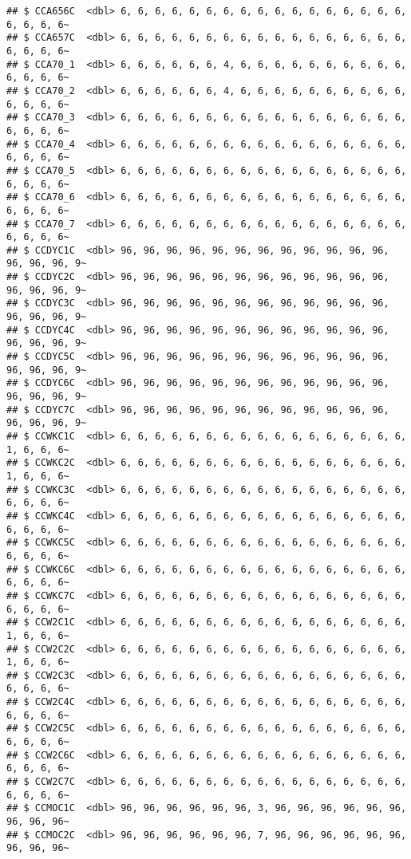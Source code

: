 \documentclass[
]{article}
\begin{document}
\begin{verbatim}
## $ CCA656C  <dbl> 6, 6, 6, 6, 6, 6, 6, 6, 6, 6, 6, 6, 6, 6, 6, 6, 6, 6, 6, 6, 6~
## $ CCA657C  <dbl> 6, 6, 6, 6, 6, 6, 6, 6, 6, 6, 6, 6, 6, 6, 6, 6, 6, 6, 6, 6, 6~
## $ CCA70_1  <dbl> 6, 6, 6, 6, 6, 6, 4, 6, 6, 6, 6, 6, 6, 6, 6, 6, 6, 6, 6, 6, 6~
## $ CCA70_2  <dbl> 6, 6, 6, 6, 6, 6, 4, 6, 6, 6, 6, 6, 6, 6, 6, 6, 6, 6, 6, 6, 6~
## $ CCA70_3  <dbl> 6, 6, 6, 6, 6, 6, 6, 6, 6, 6, 6, 6, 6, 6, 6, 6, 6, 6, 6, 6, 6~
## $ CCA70_4  <dbl> 6, 6, 6, 6, 6, 6, 6, 6, 6, 6, 6, 6, 6, 6, 6, 6, 6, 6, 6, 6, 6~
## $ CCA70_5  <dbl> 6, 6, 6, 6, 6, 6, 6, 6, 6, 6, 6, 6, 6, 6, 6, 6, 6, 6, 6, 6, 6~
## $ CCA70_6  <dbl> 6, 6, 6, 6, 6, 6, 6, 6, 6, 6, 6, 6, 6, 6, 6, 6, 6, 6, 6, 6, 6~
## $ CCA70_7  <dbl> 6, 6, 6, 6, 6, 6, 6, 6, 6, 6, 6, 6, 6, 6, 6, 6, 6, 6, 6, 6, 6~
## $ CCDYC1C  <dbl> 96, 96, 96, 96, 96, 96, 96, 96, 96, 96, 96, 96, 96, 96, 96, 9~
## $ CCDYC2C  <dbl> 96, 96, 96, 96, 96, 96, 96, 96, 96, 96, 96, 96, 96, 96, 96, 9~
## $ CCDYC3C  <dbl> 96, 96, 96, 96, 96, 96, 96, 96, 96, 96, 96, 96, 96, 96, 96, 9~
## $ CCDYC4C  <dbl> 96, 96, 96, 96, 96, 96, 96, 96, 96, 96, 96, 96, 96, 96, 96, 9~
## $ CCDYC5C  <dbl> 96, 96, 96, 96, 96, 96, 96, 96, 96, 96, 96, 96, 96, 96, 96, 9~
## $ CCDYC6C  <dbl> 96, 96, 96, 96, 96, 96, 96, 96, 96, 96, 96, 96, 96, 96, 96, 9~
## $ CCDYC7C  <dbl> 96, 96, 96, 96, 96, 96, 96, 96, 96, 96, 96, 96, 96, 96, 96, 9~
## $ CCWKC1C  <dbl> 6, 6, 6, 6, 6, 6, 6, 6, 6, 6, 6, 6, 6, 6, 6, 6, 6, 1, 6, 6, 6~
## $ CCWKC2C  <dbl> 6, 6, 6, 6, 6, 6, 6, 6, 6, 6, 6, 6, 6, 6, 6, 6, 6, 1, 6, 6, 6~
## $ CCWKC3C  <dbl> 6, 6, 6, 6, 6, 6, 6, 6, 6, 6, 6, 6, 6, 6, 6, 6, 6, 6, 6, 6, 6~
## $ CCWKC4C  <dbl> 6, 6, 6, 6, 6, 6, 6, 6, 6, 6, 6, 6, 6, 6, 6, 6, 6, 6, 6, 6, 6~
## $ CCWKC5C  <dbl> 6, 6, 6, 6, 6, 6, 6, 6, 6, 6, 6, 6, 6, 6, 6, 6, 6, 6, 6, 6, 6~
## $ CCWKC6C  <dbl> 6, 6, 6, 6, 6, 6, 6, 6, 6, 6, 6, 6, 6, 6, 6, 6, 6, 6, 6, 6, 6~
## $ CCWKC7C  <dbl> 6, 6, 6, 6, 6, 6, 6, 6, 6, 6, 6, 6, 6, 6, 6, 6, 6, 6, 6, 6, 6~
## $ CCW2C1C  <dbl> 6, 6, 6, 6, 6, 6, 6, 6, 6, 6, 6, 6, 6, 6, 6, 6, 6, 1, 6, 6, 6~
## $ CCW2C2C  <dbl> 6, 6, 6, 6, 6, 6, 6, 6, 6, 6, 6, 6, 6, 6, 6, 6, 6, 1, 6, 6, 6~
## $ CCW2C3C  <dbl> 6, 6, 6, 6, 6, 6, 6, 6, 6, 6, 6, 6, 6, 6, 6, 6, 6, 6, 6, 6, 6~
## $ CCW2C4C  <dbl> 6, 6, 6, 6, 6, 6, 6, 6, 6, 6, 6, 6, 6, 6, 6, 6, 6, 6, 6, 6, 6~
## $ CCW2C5C  <dbl> 6, 6, 6, 6, 6, 6, 6, 6, 6, 6, 6, 6, 6, 6, 6, 6, 6, 6, 6, 6, 6~
## $ CCW2C6C  <dbl> 6, 6, 6, 6, 6, 6, 6, 6, 6, 6, 6, 6, 6, 6, 6, 6, 6, 6, 6, 6, 6~
## $ CCW2C7C  <dbl> 6, 6, 6, 6, 6, 6, 6, 6, 6, 6, 6, 6, 6, 6, 6, 6, 6, 6, 6, 6, 6~
## $ CCMOC1C  <dbl> 96, 96, 96, 96, 96, 96, 3, 96, 96, 96, 96, 96, 96, 96, 96, 96~
## $ CCMOC2C  <dbl> 96, 96, 96, 96, 96, 96, 7, 96, 96, 96, 96, 96, 96, 96, 96, 96~

\end{verbatim}
\end{document}
